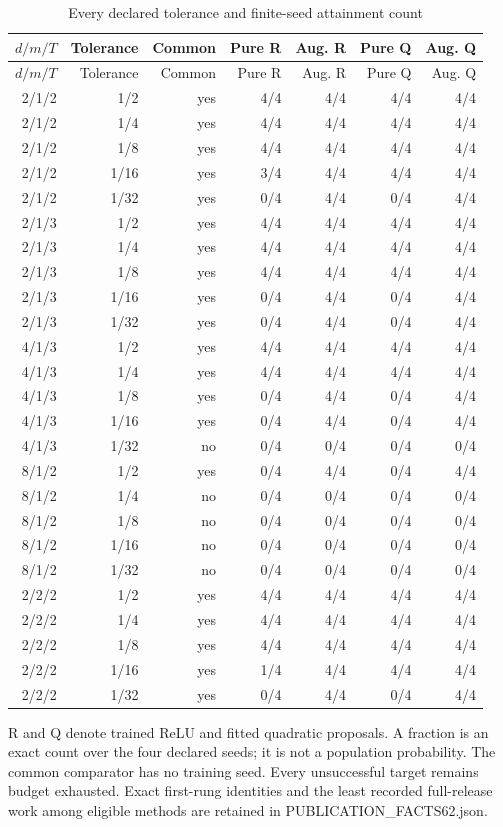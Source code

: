 {\small\setlength{\tabcolsep}{3pt}
\begin{longtable}{rrrrrrr}
\caption{Every declared tolerance and finite-seed attainment count}\label{tab:targets62} \\
\hline
$d/m/T$ & Tolerance & Common & Pure R & Aug. R & Pure Q & Aug. Q \\
\hline\endfirsthead
\hline
$d/m/T$ & Tolerance & Common & Pure R & Aug. R & Pure Q & Aug. Q \\
\hline\endhead
2/1/2 & 1/2 & yes & 4/4 & 4/4 & 4/4 & 4/4 \\
2/1/2 & 1/4 & yes & 4/4 & 4/4 & 4/4 & 4/4 \\
2/1/2 & 1/8 & yes & 4/4 & 4/4 & 4/4 & 4/4 \\
2/1/2 & 1/16 & yes & 3/4 & 4/4 & 4/4 & 4/4 \\
2/1/2 & 1/32 & yes & 0/4 & 4/4 & 0/4 & 4/4 \\
2/1/3 & 1/2 & yes & 4/4 & 4/4 & 4/4 & 4/4 \\
2/1/3 & 1/4 & yes & 4/4 & 4/4 & 4/4 & 4/4 \\
2/1/3 & 1/8 & yes & 4/4 & 4/4 & 4/4 & 4/4 \\
2/1/3 & 1/16 & yes & 0/4 & 4/4 & 0/4 & 4/4 \\
2/1/3 & 1/32 & yes & 0/4 & 4/4 & 0/4 & 4/4 \\
4/1/3 & 1/2 & yes & 4/4 & 4/4 & 4/4 & 4/4 \\
4/1/3 & 1/4 & yes & 4/4 & 4/4 & 4/4 & 4/4 \\
4/1/3 & 1/8 & yes & 0/4 & 4/4 & 0/4 & 4/4 \\
4/1/3 & 1/16 & yes & 0/4 & 4/4 & 0/4 & 4/4 \\
4/1/3 & 1/32 & no & 0/4 & 0/4 & 0/4 & 0/4 \\
8/1/2 & 1/2 & yes & 0/4 & 4/4 & 0/4 & 4/4 \\
8/1/2 & 1/4 & no & 0/4 & 0/4 & 0/4 & 0/4 \\
8/1/2 & 1/8 & no & 0/4 & 0/4 & 0/4 & 0/4 \\
8/1/2 & 1/16 & no & 0/4 & 0/4 & 0/4 & 0/4 \\
8/1/2 & 1/32 & no & 0/4 & 0/4 & 0/4 & 0/4 \\
2/2/2 & 1/2 & yes & 4/4 & 4/4 & 4/4 & 4/4 \\
2/2/2 & 1/4 & yes & 4/4 & 4/4 & 4/4 & 4/4 \\
2/2/2 & 1/8 & yes & 4/4 & 4/4 & 4/4 & 4/4 \\
2/2/2 & 1/16 & yes & 1/4 & 4/4 & 4/4 & 4/4 \\
2/2/2 & 1/32 & yes & 0/4 & 4/4 & 0/4 & 4/4 \\
\hline
\end{longtable}}
{\footnotesize R and Q denote trained ReLU and fitted quadratic proposals. A fraction is an exact count over the four declared seeds; it is not a population probability. The common comparator has no training seed. Every unsuccessful target remains budget exhausted. Exact first-rung identities and the least recorded full-release work among eligible methods are retained in PUBLICATION_FACTS62.json.}
